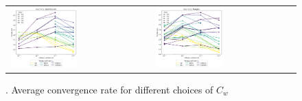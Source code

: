 \begin{figure}[h!]
	\centering
	\begin{tabular}{p{} p{}}
	\vspace{0pt}
	\includegraphics[width=0.49\textwidth]{../figs/parametric/advdiff_2D/ord_quarteroni2_2_4}
	&
	\vspace{0pt}
	\includegraphics[width=0.49\textwidth]{../figs/parametric/advdiff_2D/ord_quarteroni2_2_3}
	\end{tabular}
	\caption{. Average convergence rate for different choices of $C_w$}
	\label{fig:orders_quarteroni3}
\end{figure}


